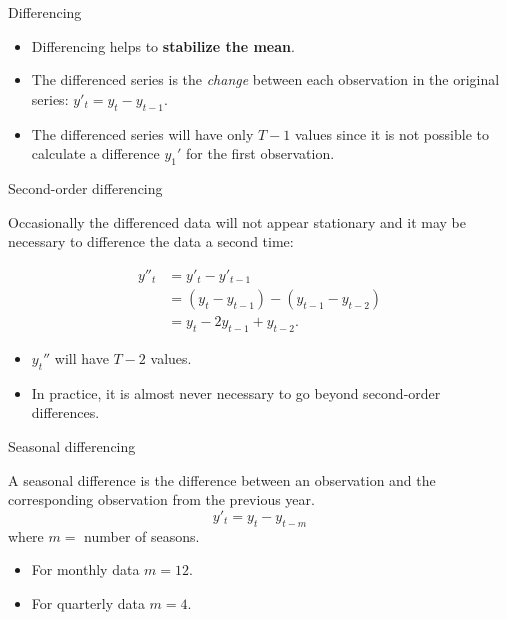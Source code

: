 \documentclass[14pt,ignorenonframetext,]{beamer}
\providecommand{\tightlist}{%
  \setlength{\itemsep}{0pt}\setlength{\parskip}{0pt}}
\begin{document}
\begin{frame}{Differencing}

\begin{itemize}
\tightlist
\item
  Differencing helps to \textbf{stabilize the mean}.
\item
  The differenced series is the \emph{change} between each observation
  in the original series: \({y'_t = y_t - y_{t-1}}\).
\item
  The differenced series will have only \(T-1\) values since it is not
  possible to calculate a difference \(y_1'\) for the first observation.
\end{itemize}

\end{frame}

\begin{frame}{Second-order differencing}

Occasionally the differenced data will not appear stationary and it may
be necessary to difference the data a second time:\pause

\begin{align*}
y''_{t}  &=  y'_{t}  - y'_{t - 1} \\
&= (y_t - y_{t-1}) - (y_{t-1}-y_{t-2})\\
&= y_t - 2y_{t-1} +y_{t-2}.
\end{align*}

\pause

\begin{itemize}
\tightlist
\item
  \(y_t''\) will have \(T-2\) values.
\item
  In practice, it is almost never necessary to go beyond second-order
  differences.
\end{itemize}

\end{frame}

\begin{frame}{Seasonal differencing}

A seasonal difference is the difference between an observation and the
corresponding observation from the previous year.\pause
\[{y'_t = y_t - y_{t-m}}\] where \(m=\) number of seasons.\pause

\begin{itemize}
\tightlist
\item
  For monthly data \(m=12\).
\item
  For quarterly data \(m=4\).
\end{itemize}

\end{frame}
\end{document}
